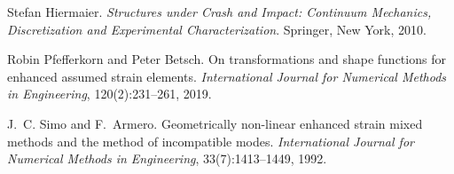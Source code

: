 \begin{DoxyDescription}
\item[\label{a03348_CITEREF_hiermaierStructuresCrashImpact2010}%
\Hypertarget{a03348_CITEREF_hiermaierStructuresCrashImpact2010}%
\mbox{[}8\mbox{]}]Stefan Hiermaier. {\itshape Structures under Crash and Impact\+: Continuum Mechanics, Discretization and Experimental Characterization}. Springer, New York, 2010.


\item[\label{a03348_CITEREF_pfefferkornTransformationsShapeFunctions2019b}%
\Hypertarget{a03348_CITEREF_pfefferkornTransformationsShapeFunctions2019b}%
\mbox{[}9\mbox{]}]Robin Pfefferkorn and Peter Betsch. On transformations and shape functions for enhanced assumed strain elements. {\itshape International Journal for Numerical Methods in Engineering}, 120(2)\+:231--261, 2019. 


\item[\label{a03348_CITEREF_simoGeometricallyNonlinearEnhanced1992a}%
\Hypertarget{a03348_CITEREF_simoGeometricallyNonlinearEnhanced1992a}%
\mbox{[}10\mbox{]}]J.~C. Simo and F.~Armero. Geometrically non-\/linear enhanced strain mixed methods and the method of incompatible modes. {\itshape International Journal for Numerical Methods in Engineering}, 33(7)\+:1413--1449, 1992. 


\end{DoxyDescription}